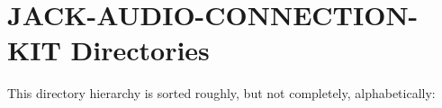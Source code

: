 \section{JACK-AUDIO-CONNECTION-KIT Directories}
This directory hierarchy is sorted roughly, but not completely, alphabetically:\begin{CompactList}
\item {}
\item {}
\end{CompactList}
